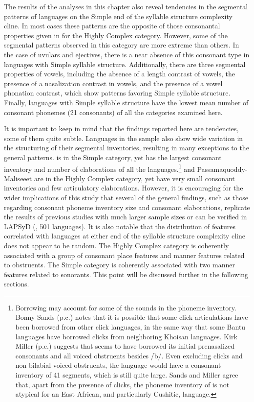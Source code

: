  The results of the analyses in this chapter also reveal tendencies in the segmental patterns of languages on the Simple end of the syllable structure complexity cline. In most cases these patterns are the opposite of those consonantal properties given in  for the Highly Complex category. However, some of the segmental patterns observed in this category are more extreme than others. In the case of uvulars and ejectives, there is a near absence of this consonant type in languages with Simple syllable structure. Additionally, there are three segmental properties of vowels, including the absence of a length contrast of vowels, the presence of a nasalization contrast in vowels, and the presence of a vowel phonation contrast, which show patterns favoring Simple syllable structure. Finally, languages with Simple syllable structure have the lowest mean number of consonant phonemes (21 consonants) of all the categories examined here.

  It is important to keep in mind that the findings reported here are tendencies, some of them quite subtle. Languages in the sample also show wide variation in the structuring of their segmental inventories, resulting in many exceptions to the general patterns.  is in the Simple category, yet has the largest consonant inventory and number of elaborations of all the languages.\footnote{Borrowing may account for some of the sounds in the  phoneme inventory. Bonny Sands (p.c.) notes that it is possible that some click articulations have been borrowed from other click languages, in the same way that some Bantu languages have borrowed clicks from neighboring Khoisan languages. Kirk Miller (p.c.) suggests that  seems to have borrowed its initial prenasalized consonants and all voiced obstruents besides /b/. Even excluding clicks and non-bilabial voiced obstruents, the language would have a consonant inventory of 41 segments, which is still quite large. Sands and Miller agree that, apart from the presence of clicks, the phoneme inventory of  is not atypical for an East African, and particularly Cushitic, language.}  and Passamaquoddy-Maliseeet are in the Highly Complex category, yet have very small consonant inventories and few articulatory elaborations. However, it is encouraging for the wider implications of this study that several of the general findings, such as those regarding consonant phoneme inventory size and consonant elaborations, replicate the results of previous studies with much larger sample sizes or can be verified in LAPSyD (\citealt{MaddiesonEtAl2013}, 501 languages). It is also notable that the distribution of features correlated with languages at either end of the syllable structure complexity cline does not appear to be random. The Highly Complex category is coherently associated with a group of consonant place features and manner features related to obstruents. The Simple category is coherently associated with two manner features related to sonorants. This point will be discussed further in the following sections.

